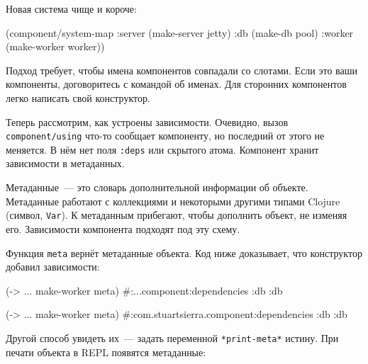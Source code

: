 \fi

\noindent
Новая система чище и короче:

\begin{english}
  \begin{clojure}
(component/system-map
 :server (make-server jetty)
 :db     (make-db pool)
 :worker (make-worker worker))
  \end{clojure}
\end{english}

Подход требует, чтобы имена компонентов совпадали со слотами. Если это ваши
компоненты, договоритесь с командой об именах. Для сторонних компонентов легко
написать свой конструктор.


Теперь рассмотрим, как устроены зависимости. Очевидно, вызов
\verb|component/using| что-то сообщает компоненту, но последний от этого не
меняется. В нём нет поля \verb|:deps| или скрытого атома. Компонент хранит
зависимости в метаданных.

Метаданные~--- это словарь дополнительной информации об объекте. Метаданные
работают с коллекциями и некоторыми другими типами Clojure (символ,
\verb|Var|). К метаданным прибегают, чтобы дополнить объект, не изменяя
его. Зависимости компонента подходят под эту схему.

Функция \verb|meta| вернёт метаданные объекта. Код ниже доказывает, что
конструктор добавил зависимости:

\ifx\DEVICETYPE\MOBILE

\begin{english}
  \begin{clojure}
(-> {...} make-worker meta)
#:...component{:dependencies {:db :db}}
  \end{clojure}
\end{english}

\else

\begin{english}
  \begin{clojure}
(-> {...} make-worker meta)
#:com.stuartsierra.component{:dependencies {:db :db}}
  \end{clojure}
\end{english}

\fi

Другой способ увидеть их~--- задать переменной \verb|*print-meta*| истину. При
печати объекта в REPL появятся метаданные:


